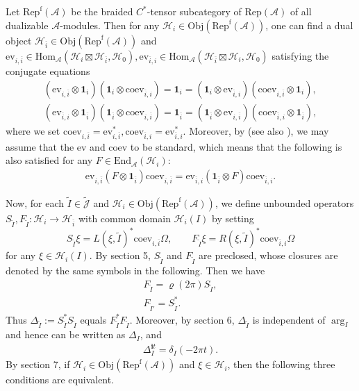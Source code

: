 \documentclass[12pt,a4paper]{article}
\theoremstyle{definition}
\theoremstyle{plain}
\newcommand{\mc}{\mathcal}
\newcommand{\wtd}{\widetilde}
\newcommand{\ovl}{\overline}
\newcommand{\End}{\mathrm{End}} %
\newcommand{\id}{\mathbf{1}}
\newcommand{\Hom}{\mathrm{Hom}}
\newcommand{\ev}{\mathrm{ev}}
\newcommand{\coev}{\mathrm{coev}}
\newcommand{\Jtd}{\widetilde{\mathcal J}}
\newcommand{\im}{\mathbf{i}}
\newcommand{\RepA}{\mathrm{Rep}(\mc A)}
\newcommand{\RepfA}{\mathrm{Rep}^{\mathrm f}(\mc A)}
\newcommand{\Obj}{\mathrm{Obj}}
\numberwithin{equation}{subsection}
\begin{document}
Let $\RepfA$ be the braided $C^*$-tensor subcategory of $\RepA$ of all dualizable $\mc A$-modules. Then for any $\mc H_i\in\Obj(\RepfA)$, one can find a dual object $\mc H_{\ovl i}\in\Obj(\RepfA)$ and $\ev_{i,\ovl i}\in\Hom_{\mc A}(\mc H_i\boxtimes\mc H_{\ovl i},\mc H_0),\ev_{\ovl i,i}\in\Hom_{\mc A}(\mc H_{\ovl i}\boxtimes\mc H_i,\mc H_0)$ satisfying the conjugate equations
\begin{gather*}
(\ev_{i,\ovl i}\otimes\id_i)(\id_i\otimes\coev_{\ovl i,i})=\id_i=(\id_i\otimes\ev_{\ovl i,i})(\coev_{i,\ovl i}\otimes\id_i),\\
(\ev_{\ovl i,i}\otimes\id_{\ovl i})(\id_{\ovl i}\otimes\coev_{i,\ovl i})=\id_{\ovl i}=(\id_{\ovl i}\otimes\ev_{i,\ovl i})(\coev_{\ovl i,i}\otimes\id_{\ovl i}),
\end{gather*}
where we set $\coev_{i,\ovl i}=\ev_{i,\ovl i}^*,\coev_{\ovl i,i}=\ev_{\ovl i,i}^*$. Moreover, by \cite{LR97} (see also \cite{Yam04,BDH14}),  we may assume that the $\ev$ and $\coev$ to be standard, which means that the following is also satisfied for any $F\in\End_{\mc A}(\mc H_i)$:
\begin{align}
\ev_{i,\ovl i}(F\otimes\id_{\ovl i})\coev_{i,\ovl i}=\ev_{\ovl i,i}(\id_{\ovl i}\otimes F)\coev_{\ovl i,i}.
\end{align}

Now, for each $\wtd I\in\Jtd$ and $\mc H_i\in\Obj(\RepfA)$, we define unbounded operators $S_{\wtd I},F_{\wtd I}:\mc H_i\rightarrow\mc H_{\ovl i}$ with common domain $\mc H_i(I)$  by setting
\begin{equation*}
S_{\wtd I}\xi=L(\xi,\wtd I)^*\coev_{i,\ovl i}\Omega,\qquad F_{\wtd I}\xi=R(\xi,\wtd I)^*\coev_{\ovl i,i}\Omega
\end{equation*}
for any $\xi\in\mc H_i(I)$. By \cite{Gui21b} section 5, $S_{\wtd I}$ and $F_{\wtd I}$ are preclosed, whose closures are denoted by the same symbols in the following. Then we have
\begin{gather}
F_{\wtd I}=\varrho(2\pi)S_{\wtd I},\\
F_{\wtd I'}=S_{\wtd I}^*.
\end{gather}
Thus $\Delta_{\wtd I}:=S_{\wtd I}^*S_{\wtd I}$ equals $F_{\wtd I}^*F_{\wtd I}$. Moreover, by \cite{Gui21b} section 6, $\Delta_{\wtd I}$ is independent of $\arg_I$ and hence can be written as $\Delta_I$, and
\begin{align}
\Delta_I^{\im t}=\delta_I(-2\pi t).
\end{align}
By \cite{Gui21b} section 7, if $\mc H_i\in\Obj(\RepfA)$ and $\xi\in\mc H_i$, then the following three conditions are equivalent.
\end{document}
